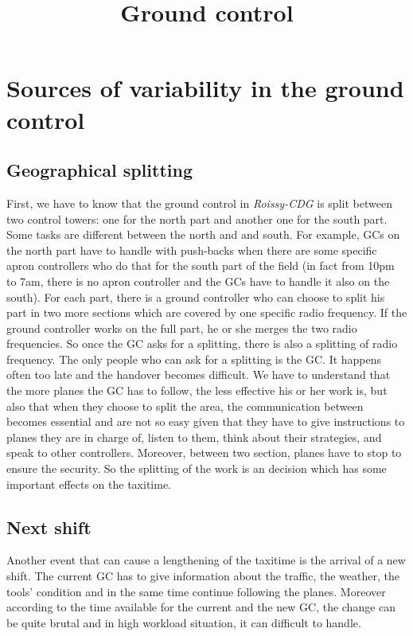 \documentclass{article}
\title{Ground control}
\begin{document}
\maketitle
\section{Sources of variability in the ground control}
\subsection{Geographical splitting}
First, we have to know that the ground control in \textit{Roissy-CDG} is split between two control towers: one for the north part and another one for the south part. Some tasks are different between the north and and south. For example, GCs on the north part have to handle with push-backs when there are some specific apron controllers who do that for the south part of the field (in fact from 10pm to 7am, there is no apron controller and the GCs have to handle it also on the south). For each part, there is a ground controller who can choose to split his part in two more sections which are covered by one specific radio frequency. If the ground controller works on the full part, he or she merges the two radio frequencies. So once the GC asks for a splitting, there is also a splitting of radio frequency. The only people who can ask for a splitting is the GC. It happens often too late and the handover becomes difficult. We have to understand that the more planes the GC has to follow, the less effective his or her work is, but also that when they choose to split the area, the communication between becomes essential and are not so easy given that they have to give instructions to planes they are in charge of, listen to them, think about their strategies, and speak to other controllers. Moreover, between two section, planes have to stop to ensure the security. So the splitting of the work is an decision which has some important effects on the taxitime. 
\subsection{Next shift}
Another event that can cause a lengthening of the taxitime is the arrival of a new shift. The current GC has to give information about the traffic, the weather, the tools' condition and in the same time continue following the planes. Moreover according to the time available for the current and the new GC, the change can be quite brutal and in high workload situation, it can difficult to handle. 
\end{document}
